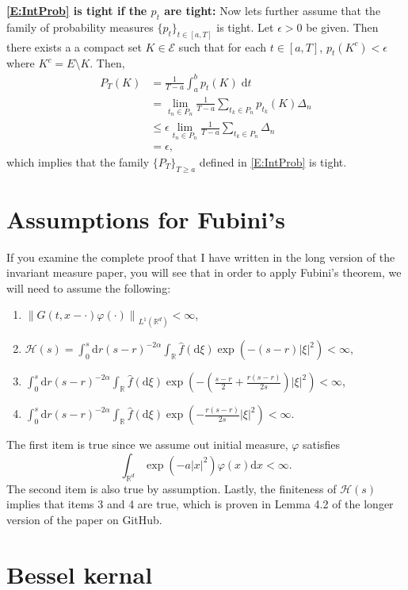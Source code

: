 \documentclass{article}
\numberwithin{equation}{section}
\newcommand{\R}{\mathbb{R}}
\newcommand{\Norm}[1]{\left\|  #1   \right\|}
\newcommand{\ud}{\ensuremath{\mathrm{d}}}
\begin{document}
\noindent \textbf{\eqref{E:IntProb} is tight if the $p_t$ are tight:} Now lets further assume that the family of probability measures $\{p_t\}_{t \in [a,T]}$ is tight. Let $\epsilon>0$ be given. Then there exists a a compact set $K \in \mathscr{E}$ such that for each $t \in [a,T]$, $p_t(K^c) < \epsilon$ where $K^c = E \setminus K$. Then,
	\begin{align*}
		P_T(K) &= \frac{1}{T-a} \int_a^b p_t(K) \; \ud t \\
		&= \lim_{t_n \in P_n} \frac{1}{T-a}\sum_{t_k \in P_n} p_{t_k}(K) \Delta_n \\
		& \le \epsilon  \lim_{t_n \in P_n} \frac{1}{T-a}\sum_{t_k \in P_n} \Delta_n \\
		&= \epsilon,
	\end{align*}
which implies that the family  $\{P_T\}_{T \ge a}$ defined in \eqref{E:IntProb} is tight.

\newpage
\section{Assumptions for Fubini's}
If you examine the complete proof that I have written in the long version of the invariant measure paper, you will see that in order to apply Fubini's theorem, we will need to assume the following:
	\begin{enumerate}
		\item $ \Norm{G(t,x-\cdot)\varphi(\cdot)}_{L^1(\R^d)} < \infty$,
		\item $ \mathcal{H}(s) = \int_0^s \ud r (s-r)^{-2\alpha} \int_{\R} \hat{f}(\ud \xi) \exp\left(-(s-r) |\xi|^2\right) < \infty $,
		\item $\int_0^s \ud r (s-r)^{-2\alpha} \int_{\R} \hat{f}(\ud \xi) \exp\left( -\left( \frac{s-r}{2} + \frac{r(s-r)}{2s} \right) |\xi|^2 \right) < \infty $,
		\item $\int_0^s \ud r (s-r)^{-2\alpha} \int_{\R} \hat{f}(\ud \xi) \exp\left( -\frac{r(s-r)}{2s} |\xi|^2 \right) < \infty $.
	\end{enumerate}
The first item is true since we assume out initial measure, $\varphi$ satisfies
	\[
		\int_{\R^d} \exp(-a|x|^2) \varphi(x) \ud x < \infty.
	\]
The second item is also true by assumption. Lastly, the finiteness of $\mathcal{H}(s)$ implies that items 3 and 4 are true, which is proven in Lemma 4.2 of the longer version of the paper on GitHub.

\section{Bessel kernal}
\end{document}
